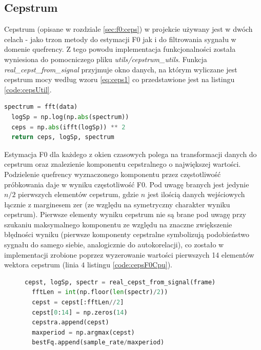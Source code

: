 \documentclass[12pt,a4paper,twoside]{mwart}
\begin{document}
\subsection{Cepstrum}\label{sec:impl:alg:ceps}
Cepstrum (opisane w rozdziale \ref{sec:f0:ceps}) w projekcie używany jest w dwóch celach - jako trzon metody do estymacji F0 jak i do filtrowania sygnału w domenie quefrency. Z tego powodu implementacja funkcjonalności została wyniesiona do pomocniczego pliku \textit{utils/cepstrum\_utils}. Funkcja \textit{real\_cepst\_from\_signal} przyjmuje okno danych, na którym wyliczane jest cepstrum mocy według wzoru \ref{eq:ceps1} co przedstawione jest na listingu \ref{code:cepsUtil}.

\begin{lstlisting}[language=Python, caption={Wyliczanie cepstrum mocy}, captionpos=b, label={code:cepsUtil}]
  spectrum = fft(data)
  logSp = np.log(np.abs(spectrum))
  ceps = np.abs(ifft(logSp)) ** 2
  return ceps, logSp, spectrum
\end{lstlisting}

Estymacja F0 dla każdego z okien czasowych polega na transformacji danych do cepstrum oraz znalezienie komponentu cepstralnego o największej wartości. Podzielenie quefrency wyznaczonego komponentu przez częstotliwość próbkowania daje w wyniku częstotliwość F0. Pod uwagę branych jest jedynie $n / 2$ pierwszych elementów cepstrum, gdzie $n$ jest ilością danych wejściowych łącznie z marginesem zer (ze względu na symetryczny charakter wyniku cepstrum). Pierwsze elementy wyniku cepstrum nie są brane pod uwagę przy szukaniu maksymalnego komponentu ze względu na znaczne zwiększenie błędności wyniku (pierwsze komponenty cepstralne symbolizują podobieństwo sygnału do samego siebie, analogicznie do autokorelacji), co zostało w implementacji zrobione poprzez wyzerowanie wartości pierwszych 14 elementów wektora cepstrum (linia $4$ listingu \ref{code:cepsF0Cpu}). 

\begin{figure}  
\begin{lstlisting}[language=Python, caption={Estymacja F0 przy pomocy cepstrum}, captionpos=b, label={code:cepsF0Cpu}]
  cepst, logSp, spectr = real_cepst_from_signal(frame)
  fftLen = int(np.floor(len(spectr)/2))
  cepst = cepst[:fftLen//2]
  cepst[0:14] = np.zeros(14)
  cepstra.append(cepst)
  maxperiod = np.argmax(cepst)
  bestFq.append(sample_rate/maxperiod)
\end{lstlisting}
\end{figure}
\end{document}
